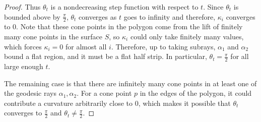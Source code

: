 \documentclass[10pt,a4paper]{amsart}
\begin{document}
\begin{proof}
Thus $\theta_t$ is a nondecreasing step function with respect to $t$. Since $\theta_t$ is bounded above by $\frac{\pi}{2}$, $\theta_t$ converges as $t$ goes to infinity and therefore, $\kappa_i$ converges to $0$. Note that these cone points in the polygon come from the lift of finitely many cone points in the surface $S$, so $\kappa_i$ could only take finitely many values, which forces $\kappa_i=0$ for almost all $i$. Therefore, up to taking subrays, $\alpha_1$ and $\alpha_2$ bound a flat region, and it must be a flat half strip. In particular, $\theta_t=\frac{\pi}{2}$ for all large enough $t$. 

The remaining case is that there are infinitely many cone points in at least one of the geodesic rays $\alpha_1,\alpha_2$. For a cone point $p$ in the edges of the polygon, it could contribute a curvature arbitrarily close to 0, which makes it possible that $\theta_t$ converges to $\frac{\pi}{2}$ and $\theta_t\ne \frac{\pi}{2}$.
\end{proof}
\end{document}
